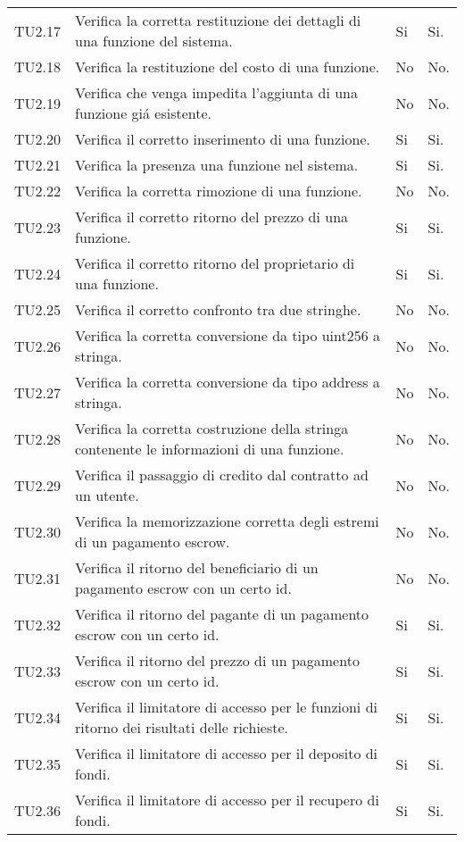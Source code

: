 \begin{longtable}{
		>{\centering}p{}
		>{}p{}
		>{\centering}p{}
		>{\centering}p{} }
		TU2.17  &  Verifica la corretta restituzione dei dettagli di una funzione del sistema. &
		Si & Si. \tabularnewline

		TU2.18  &  Verifica la restituzione del costo di una funzione. &
		No & No. \tabularnewline

		TU2.19  &  Verifica che venga impedita l'aggiunta di una funzione giá esistente. &
		No & No. \tabularnewline

		TU2.20  &  Verifica il corretto inserimento di una funzione. &%
		Si & Si. \tabularnewline

		TU2.21  &  Verifica la presenza una funzione nel sistema.	&
		 Si & Si. \tabularnewline

		TU2.22  &  Verifica la corretta rimozione di una funzione. &
		No & No. \tabularnewline

		TU2.23  &  Verifica il corretto ritorno del prezzo di una funzione. &
		Si & Si. \tabularnewline

		TU2.24  &  Verifica il corretto ritorno del proprietario di una funzione. &
		Si & Si. \tabularnewline

		TU2.25  &  Verifica il corretto confronto tra due stringhe. &
		No & No. \tabularnewline

		TU2.26  &  Verifica la corretta conversione da tipo uint256 a stringa. &
		No & No. \tabularnewline

		TU2.27  &  Verifica la corretta conversione da tipo address a stringa. &
		No & No. \tabularnewline

		TU2.28  &  Verifica la corretta costruzione della stringa contenente le informazioni di una funzione. &
		No & No. \tabularnewline

		TU2.29  &  Verifica il passaggio di credito dal contratto ad un utente. & %
		No & No. \tabularnewline

		TU2.30  &  Verifica la memorizzazione corretta degli estremi di un pagamento escrow. &
		No & No. \tabularnewline

		TU2.31  &  Verifica il ritorno del beneficiario di un pagamento escrow con un certo id. &
		No & No. \tabularnewline

		TU2.32  &  Verifica il ritorno del pagante di un pagamento escrow con un certo id.  &
		Si & Si. \tabularnewline

		TU2.33  &  Verifica il ritorno del prezzo di un pagamento escrow con un certo id.  &
		Si & Si. \tabularnewline

		TU2.34  &  Verifica il limitatore di accesso per le funzioni di ritorno dei risultati delle richieste.	&
		 Si & Si. \tabularnewline

		TU2.35  &  Verifica il limitatore di accesso per il deposito di fondi.	&
		 Si & Si. \tabularnewline

		TU2.36  &  Verifica il limitatore di accesso per il recupero di fondi.	&
		 Si & Si. \tabularnewline




\end{longtable}
